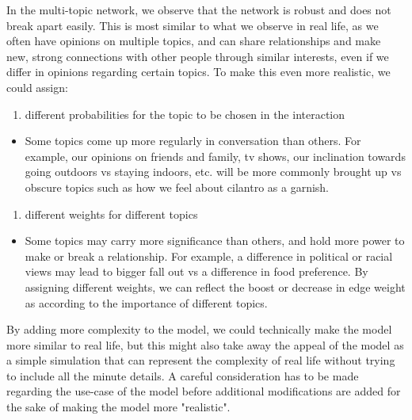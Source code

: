 \documentclass[11pt]{article}
\providecommand{\tightlist}{%
      \setlength{\itemsep}{0pt}\setlength{\parskip}{0pt}}
\begin{document}
In the multi-topic network, we observe that the network is robust and
does not break apart easily. This is most similar to what we observe in
real life, as we often have opinions on multiple topics, and can share
relationships and make new, strong connections with other people through
similar interests, even if we differ in opinions regarding certain
topics. To make this even more realistic, we could assign:

\begin{enumerate}
\def\labelenumi{\alph{enumi})}
\tightlist
\item
  different probabilities for the topic to be chosen in the interaction
\end{enumerate}

\begin{itemize}
\tightlist
\item
  Some topics come up more regularly in conversation than others. For
  example, our opinions on friends and family, tv shows, our inclination
  towards going outdoors vs staying indoors, etc. will be more commonly
  brought up vs obscure topics such as how we feel about cilantro as a
  garnish.
\end{itemize}

\begin{enumerate}
\def\labelenumi{\alph{enumi})}
\setcounter{enumi}{1}
\tightlist
\item
  different weights for different topics
\end{enumerate}

\begin{itemize}
\tightlist
\item
  Some topics may carry more significance than others, and hold more
  power to make or break a relationship. For example, a difference in
  political or racial views may lead to bigger fall out vs a difference
  in food preference. By assigning different weights, we can reflect the
  boost or decrease in edge weight as according to the importance of
  different topics.
\end{itemize}

By adding more complexity to the model, we could technically make the
model more similar to real life, but this might also take away the
appeal of the model as a simple simulation that can represent the
complexity of real life without trying to include all the minute
details. A careful consideration has to be made regarding the use-case
of the model before additional modifications are added for the sake of
making the model more "realistic".


    
    
    
    
\end{document}
